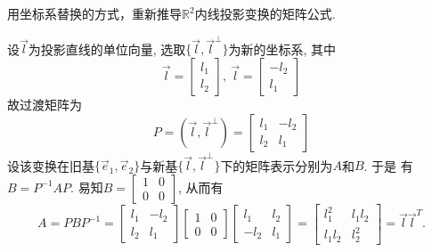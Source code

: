 \begin{eg}
用坐标系替换的方式，重新推导$\mathbb{R}^2$内线投影变换的矩阵公式.

设$\vec{l}$为投影直线的单位向量, 选取$\{\vec{l},\vec{l}^{\bot}\}$为新的坐标系, 其中
$$\vec{l}=\begin{bmatrix}l_1\\l_2\end{bmatrix},\ \vec{l}=\begin{bmatrix}-l_2\\l_1\end{bmatrix}$$
故过渡矩阵为
$$P=(\vec{l},\vec{l}^{\bot})=\begin{bmatrix} l_1&-l_2\\l_2&l_1\end{bmatrix}$$
设该变换在旧基$\{\vec{e}_1,\vec{e}_2\}$与新基$\{\vec{l},\vec{l}^{\bot}\}$下的矩阵表示分别为$A$和$B$. 于是
有$B=P^{-1}AP$. 易知$B=\begin{bmatrix}1&0\\0&0\end{bmatrix}$, 从而有
$$A=PBP^{-1}=\begin{bmatrix}l_1&-l_2\\l_2&l_1\end{bmatrix}\begin{bmatrix}1&0\\
0&0\end{bmatrix}\begin{bmatrix}l_1&l_2\\-l_2&l_1\end{bmatrix}=\begin{bmatrix}
l_1^2&l_1l_2\\l_1l_2&l_2^2\end{bmatrix}=\vec{l}\vec{l}^T.$$
\end{eg}

